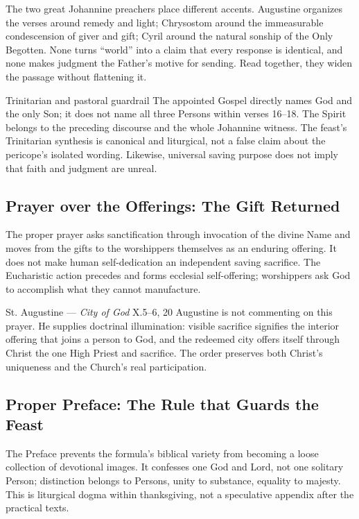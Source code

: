 \begin{deepstudy}
The two great Johannine preachers place different accents. Augustine organizes the verses around remedy and light; Chrysostom around the immeasurable condescension of giver and gift; Cyril around the natural sonship of the Only Begotten. None turns “world” into a claim that every response is identical, and none makes judgment the Father's motive for sending. Read together, they widen the passage without flattening it.

\begin{studybox}{Trinitarian and pastoral guardrail}
The appointed Gospel directly names God and the only Son; it does not name all three Persons within verses 16--18. The Spirit belongs to the preceding discourse and the whole Johannine witness. The feast's Trinitarian synthesis is canonical and liturgical, not a false claim about the pericope's isolated wording. Likewise, universal saving purpose does not imply that faith and judgment are unreal.
\end{studybox}

\subsection*{Prayer over the Offerings: The Gift Returned\enspace{}}

The proper prayer asks sanctification through invocation of the divine Name and moves from the gifts to the worshippers themselves as an enduring offering. It does not make human self-dedication an independent saving sacrifice. The Eucharistic action precedes and forms ecclesial self-offering; worshippers ask God to accomplish what they cannot manufacture.

\begin{sourcecard}{St. Augustine --- \emph{City of God} X.5--6, 20}
Augustine is not commenting on this prayer. He supplies doctrinal illumination: visible sacrifice signifies the interior offering that joins a person to God, and the redeemed city offers itself through Christ the one High Priest and sacrifice. The order preserves both Christ's uniqueness and the Church's real participation.
\end{sourcecard}

\subsection*{Proper Preface: The Rule that Guards the Feast\enspace{}}

The Preface prevents the formula's biblical variety from becoming a loose collection of devotional images. It confesses one God and Lord, not one solitary Person; distinction belongs to Persons, unity to substance, equality to majesty. This is liturgical dogma within thanksgiving, not a speculative appendix after the practical texts.


\end{deepstudy}
